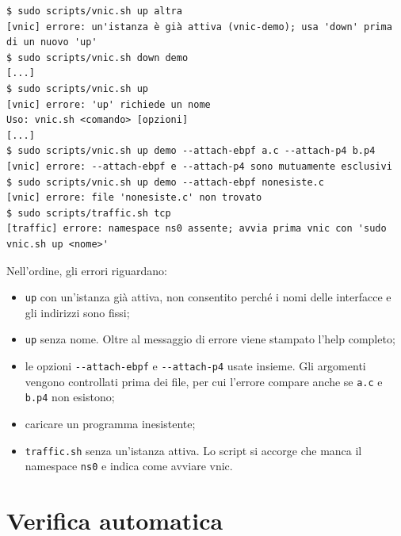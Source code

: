 \noindent\begin{minipage}{\linewidth}
\begin{lstlisting}[style=terminale, caption={Risposta di \texttt{vnic.sh} e \texttt{traffic.sh} a input errati}, label={lst:errori}]
$ sudo scripts/vnic.sh up altra
[vnic] errore: un'istanza è già attiva (vnic-demo); usa 'down' prima di un nuovo 'up'
$ sudo scripts/vnic.sh down demo
[...]
$ sudo scripts/vnic.sh up
[vnic] errore: 'up' richiede un nome
Uso: vnic.sh <comando> [opzioni]
[...]
$ sudo scripts/vnic.sh up demo --attach-ebpf a.c --attach-p4 b.p4
[vnic] errore: --attach-ebpf e --attach-p4 sono mutuamente esclusivi
$ sudo scripts/vnic.sh up demo --attach-ebpf nonesiste.c
[vnic] errore: file 'nonesiste.c' non trovato
$ sudo scripts/traffic.sh tcp
[traffic] errore: namespace ns0 assente; avvia prima vnic con 'sudo vnic.sh up <nome>'
\end{lstlisting}
\end{minipage}

Nell'ordine, gli errori riguardano:
\begin{itemize}
    \item \texttt{up} con un'istanza già attiva, non consentito perché i nomi delle interfacce e gli indirizzi sono fissi;
    \item \texttt{up} senza nome. Oltre al messaggio di errore viene stampato l'help completo;
    \item le opzioni \texttt{-{}-attach-ebpf} e \texttt{-{}-attach-p4} usate insieme. Gli argomenti vengono controllati prima dei file, per cui l'errore compare anche se \texttt{a.c} e \texttt{b.p4} non esistono;
    \item caricare un programma inesistente;
    \item \texttt{traffic.sh} senza un'istanza attiva. Lo script si accorge che manca il namespace \texttt{ns0} e indica come avviare vnic.
\end{itemize}

\section{Verifica automatica}\label{sec:verifica}

